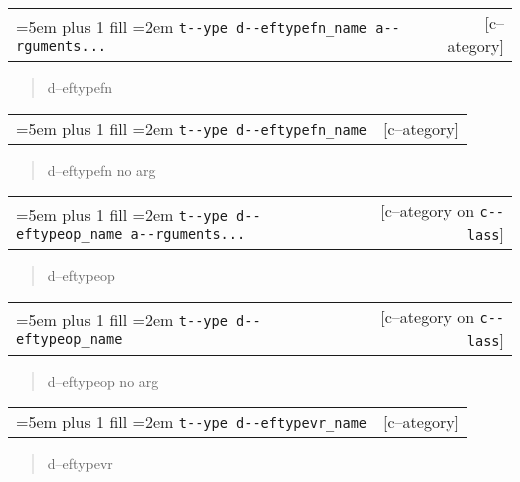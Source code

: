 \documentclass{book}
\begin{document}
\noindent\begin{tabularx}{\linewidth}{@{}Xr}
\rightskip=5em plus 1 fill
\hangindent=2em
\texttt{t{-}{-}ype d{-}{-}eftypefn\_name a{-}{-}rguments...}& [c--ategory]
\end{tabularx}

%
\begin{quote}
\unskip{\parskip=0pt\noindent}%
d--eftypefn
\end{quote}


\noindent\begin{tabularx}{\linewidth}{@{}Xr}
\rightskip=5em plus 1 fill
\hangindent=2em
\texttt{t{-}{-}ype d{-}{-}eftypefn\_name}& [c--ategory]
\end{tabularx}

%
\begin{quote}
\unskip{\parskip=0pt\noindent}%
d--eftypefn no arg
\end{quote}


\noindent\begin{tabularx}{\linewidth}{@{}Xr}
\rightskip=5em plus 1 fill
\hangindent=2em
\texttt{t{-}{-}ype d{-}{-}eftypeop\_name a{-}{-}rguments...}& [c--ategory on \texttt{c{-}{-}lass}]
\end{tabularx}

%
\begin{quote}
\unskip{\parskip=0pt\noindent}%
d--eftypeop
\end{quote}


\noindent\begin{tabularx}{\linewidth}{@{}Xr}
\rightskip=5em plus 1 fill
\hangindent=2em
\texttt{t{-}{-}ype d{-}{-}eftypeop\_name}& [c--ategory on \texttt{c{-}{-}lass}]
\end{tabularx}

%
\begin{quote}
\unskip{\parskip=0pt\noindent}%
d--eftypeop no arg
\end{quote}


\noindent\begin{tabularx}{\linewidth}{@{}Xr}
\rightskip=5em plus 1 fill
\hangindent=2em
\texttt{t{-}{-}ype d{-}{-}eftypevr\_name}& [c--ategory]
\end{tabularx}

%
\begin{quote}
\unskip{\parskip=0pt\noindent}%
d--eftypevr
\end{quote}
\end{document}
